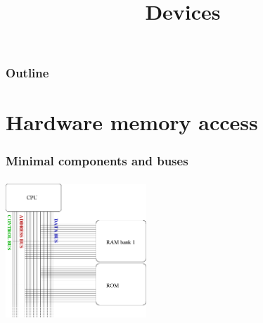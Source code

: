 %
%
%
%
%
%

%
%


%
%

\def\path{../../..}

%
%



%
%

\title{Devices}

%
%



%
%

\begin{frame}
  \titlepage
\end{frame}

%
%

\begin{frame}
  \frametitle{Outline}

  \tableofcontents
\end{frame}


\section{Hardware memory access}
\begin{frame}
  \frametitle{Minimal components and buses}
  \begin{center}
    \includegraphics[width=150pt,height=150pt]{figures/arch-basic}
  \end{center}
\end{frame}


